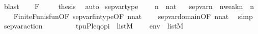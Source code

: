 \begin{isabellebody}
\ blast\isanewline
\ \ \isamarkupfalse%
\ F\ \isanewline
\ \ \isamarkupfalse%
\ {\isacharquery}{\kern0pt}thesis\ \isamarkupfalse%
\ auto\isanewline
{}\isamarkupfalse%
%
\endisatagproof
{\isafoldproof}%
%
\isadelimproof
\isanewline
%
\endisadelimproof
\isanewline
{}\isamarkupfalse%
\ sep{\isacharunderscore}{\kern0pt}var{\isacharunderscore}{\kern0pt}type\ {\isacharcolon}{\kern0pt}\isanewline
\ \ \ {\isachardoublequoteopen}n\ {\isasymin}\ nat{\isachardoublequoteclose}\isanewline
\ \ \ {\isachardoublequoteopen}sep{\isacharunderscore}{\kern0pt}var{\isacharparenleft}{\kern0pt}n{\isacharparenright}{\kern0pt}\ {\isacharcolon}{\kern0pt}\ {\isacharparenleft}{\kern0pt}{}{\isacharhash}{\kern0pt}{\isacharplus}{\kern0pt}n{\isacharparenright}{\kern0pt}{\isacharminus}{\kern0pt}weak{\isacharparenleft}{\kern0pt}n{\isacharcomma}{\kern0pt}{}{\isacharparenright}{\kern0pt}\ {\isasymrightarrow}\ {}{\isacharhash}{\kern0pt}{\isacharplus}{\kern0pt}n{\isachardoublequoteclose}\isanewline
%
\isadelimproof
\ \ %
\endisadelimproof
%
\isatagproof
{}\isamarkupfalse%
\ FiniteFun{\isacharunderscore}{\kern0pt}is{\isacharunderscore}{\kern0pt}fun{\isacharbrackleft}{\kern0pt}OF\ sep{\isacharunderscore}{\kern0pt}var{\isacharunderscore}{\kern0pt}fin{\isacharunderscore}{\kern0pt}type{\isacharbrackleft}{\kern0pt}OF\ {\isacartoucheopen}n{\isasymin}nat{\isacartoucheclose}{\isacharbrackright}{\kern0pt}{\isacharbrackright}{\kern0pt}\isanewline
\ \ \ \ sep{\isacharunderscore}{\kern0pt}var{\isacharunderscore}{\kern0pt}domain{\isacharbrackleft}{\kern0pt}OF\ {\isacartoucheopen}n{\isasymin}nat{\isacartoucheclose}{\isacharbrackright}{\kern0pt}\ \isamarkupfalse%
\ simp%
\endisatagproof
{\isafoldproof}%
%
\isadelimproof
\isanewline
%
\endisadelimproof
\isanewline
{}\isamarkupfalse%
\ sep{\isacharunderscore}{\kern0pt}var{\isacharunderscore}{\kern0pt}action\ {\isacharcolon}{\kern0pt}\isanewline
\ \ \ \isanewline
\ \ \ \ {\isachardoublequoteopen}{\isacharbrackleft}{\kern0pt}t{\isacharcomma}{\kern0pt}p{\isacharcomma}{\kern0pt}u{\isacharcomma}{\kern0pt}P{\isacharcomma}{\kern0pt}leq{\isacharcomma}{\kern0pt}o{\isacharcomma}{\kern0pt}pi{\isacharbrackright}{\kern0pt}\ {\isasymin}\ list{\isacharparenleft}{\kern0pt}M{\isacharparenright}{\kern0pt}{\isachardoublequoteclose}\isanewline
\ \ \ \ {\isachardoublequoteopen}env\ {\isasymin}\ list{\isacharparenleft}{\kern0pt}M{\isacharparenright}{\kern0pt}{\isachardoublequoteclose}\isanewline

\end{isabellebody}
